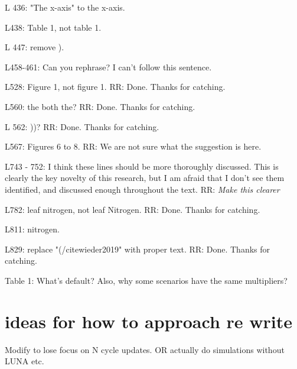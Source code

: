 \documentclass{article}
\begin{document}
L 436: "The x-axis" to the x-axis. 

L438: Table 1, not table 1. 

L 447: remove ). 

L458-461: Can you rephrase? I can't follow this sentence. 

L528: Figure 1, not figure 1. 
RR: Done. Thanks for catching. 

L560: the both the? 
RR: Done. Thanks for catching. 
 
L 562: ))? 
RR: Done. Thanks for catching. 

L567: Figures 6 to 8. 
RR: We are not sure what the suggestion is here. 

L743 - 752: I think these lines should be more thoroughly discussed. This is clearly the key novelty of this research, but I am afraid that I don't see them identified, and discussed enough throughout the text. 
RR: \emph{Make this clearer}

L782: leaf nitrogen, not leaf Nitrogen. 
RR: Done. Thanks for catching. 

L811: nitrogen. 

L829: replace "(/citewieder2019" with proper text. 
RR: Done. Thanks for catching. 

Table 1: What's default? Also, why some scenarios have the same multipliers? 

\section{ideas for how to approach re write}
Modify to lose focus on N cycle updates.
OR
actually do simulations without LUNA etc. 
\end{document}
